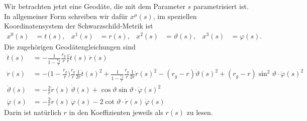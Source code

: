 Wir betrachten jetzt eine Geodäte, die mit dem Parameter $s$ parametrisiert ist.
In allgemeiner Form schreiben wir dafür $x^\mu(s)$, im speziellen
Koordinatensystem der Schwarzschild-Metrik ist
\[
\begin{aligned}
x^0(s)&=t(s),
&
x^1(s)&=r(s),
&
x^2(s)&=\vartheta(s),
&
x^3(s)&=\varphi(s).
\end{aligned}
\]
Die zugehörigen Geodätengleichungen sind
\begin{align*}
\ddot t(s)
&=
-\frac{1}{1-\displaystyle\frac{r_g}{r}}\frac{r_g}{r}\frac{1}{r}\dot t(s)\,\dot r(s)
\\
\ddot r(s)
&=
-\biggl(1-\frac{r_g}{r}\biggr)\frac{r_g}{r}\frac1{2r}\dot t(s)^2
+\frac{1}{1-\displaystyle\frac{r_g}{r}} \frac{r_g}{r}\frac1{2r}\dot r(s)^2
-(r_g-r)\dot \vartheta(s)^2 + (r_g-r)\sin^2 \vartheta \cdot \dot \varphi(s)^2
\\
\ddot \vartheta(s)
&=
-\frac{2}{r} \dot r(s)\, \dot \vartheta(s)
+\cos\vartheta\sin\vartheta \cdot \dot\varphi(s)^2
\\
\ddot \varphi(s)
&=
-\frac{2}{r} \dot r(s)\,\dot \varphi(s)
-2\cot\vartheta \cdot \dot r(s)\,\dot\varphi(s)
\end{align*}
Darin ist natürlich $r$ in den Koeffizienten jeweils als $r(s)$ zu lesen.

